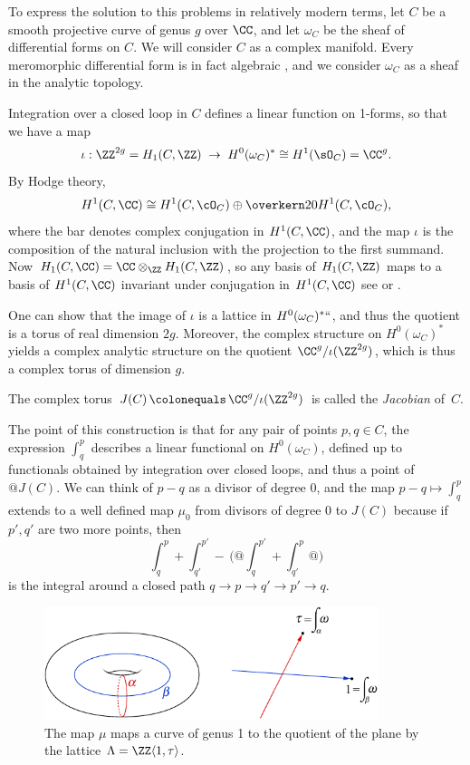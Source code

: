 To express the solution to this problems in relatively modern terms,
let $C$ be a smooth projective curve of genus $g$ over $\CC$, and let
$\omega_{C}$ be the sheaf of differential forms on $C$. We will
consider $C$ as a
complex manifold.
%
Every meromorphic differential form is in fact algebraic
\cite{GAGA}, and we consider $\omega_{C}$ as a sheaf in the analytic topology.

Integration
%
over a closed loop in $C$ defines a linear function on 1-forms, so that we have a map
$$
\iota: \ZZ^{2g} = H_1(C,\ZZ) \; \to \;  H^0(\omega_C)^* \cong H^1(\sO_C) = \CC^{g}.
$$
By Hodge theory,
%
$$
H^1(C, \CC) \cong H^1(C, \cO_C) \oplus \overkern20{H^1(C, \cO_C)}
,
$$
where the bar denotes complex conjugation in $H^1(C, \CC)$, and the map $\iota$ is the composition of
 the natural inclusion with the projection to the first summand.
 Now
$H_1(C,\CC) = \CC\otimes_\ZZ H_1(C,\ZZ)$, so any basis of $H_1(C,\ZZ)$ maps to a basis of
$H^1(C, \CC)$ invariant under conjugation in $H^1(C, \CC)$\emdash
see \cite{Voisin} or \cite[p.\,116]{Griffiths-Harris1978}.

One can show that the image of $\iota$ is a
%
lattice in $H^0(\omega_C)^*` `$, and thus the quotient
is a torus of real dimension $2g$.
Moreover, the
complex structure on $H^0(\omega_C)^*$ yields a complex analytic structure on the quotient $\CC^{g}/\iota(\ZZ^{2g})$, which is thus a complex torus of  dimension $g$.
%

\begin{definition}
\hskip-3pt
The complex torus $J(C) \,{\colonequals}\, \CC^{g}/\iota(\ZZ^{2g})$
%
%
is called the \emph{Jacobian} of~$C$.%
\unif
\end{definition}

The point of this construction is that for any pair of points $p, q
\in C$, the expression $\int_q^p$ describes a linear functional on
$H^0(\omega_C)$, defined up to functionals obtained by integration
over closed loops, and thus a point of $@J(C)$. We can think of $p-q$
as a divisor of
degree 0, and the map $p-q \mapsto \int_q^p$ extends to a well defined map $\mu_0$ from divisors of degree 0 to $J(C)$ because if $p',q'$ are two more points, then
{\meshing
$$
\int_q^p +\int_{q'}^{p'} \! - \,\biggl(@\int_q^{p'} +\int_{q'}^p@\biggr)
$$}%
is the integral around a closed path $q\to p\to q'\to p' \to q$.

\begin{figure}
\includegraphics[height=1.3in]{"main/Fig04-3"}
 \caption{The map $\mu$ maps a curve of genus 1 to the quotient of the plane by the lattice $\Lambda = \ZZ\langle 1,\tau\rangle$.}
\label{abeljacobi}
\end{figure}

